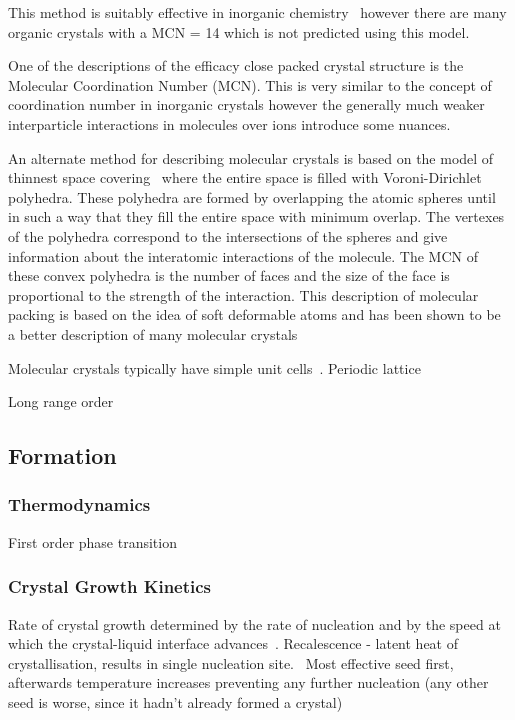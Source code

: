 This method is suitably effective in inorganic chemistry~\cite{wells:84} however there are many organic crystals with a MCN = 14 which is not predicted using this model.

One of the descriptions of the efficacy close packed crystal structure is the Molecular Coordination Number (MCN). This is very similar to the concept of coordination number in inorganic crystals however the generally much weaker interparticle interactions in molecules over ions introduce some nuances.


An alternate method for describing molecular crystals is based on the model of thinnest space covering~\cite{blatov:95} where the entire space is filled with Voroni-Dirichlet polyhedra. These polyhedra are formed by overlapping the atomic spheres until in such a way that they fill the entire space with minimum overlap. The vertexes of the polyhedra correspond to the intersections of the spheres and give information about the interatomic interactions of the molecule. The MCN of these convex polyhedra is the number of faces and the size of the face is proportional to the strength of the interaction. This description of molecular packing is based on the idea of soft deformable atoms and has been shown to be a better description of many molecular crystals~\cite{blatov:97,peresypkina:99,peresypkina:00}


Molecular crystals typically have simple unit cells~\cite{brock:94}. Periodic lattice

Long range order
\subsection{Formation}
\subsubsection{Thermodynamics}
First order phase transition

\subsubsection{Crystal Growth Kinetics}
Rate of crystal growth determined by the rate of nucleation and by the speed at which the crystal-liquid interface advances~\cite{turnbull:69}.
Recalescence - latent heat of crystallisation, results in single nucleation site.~\cite{turnbull:69} Most effective seed first, afterwards temperature increases preventing any further nucleation (any other seed is worse, since it hadn't already formed a crystal)

